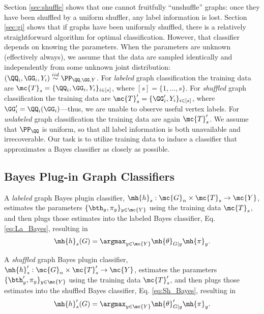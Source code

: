 \documentclass[10pt,journal,cspaper,compsoc]{IEEEtran}
\begin{document}
Section \ref{sec:shuffle} shows that one cannot fruitfully ``unshuffle'' graphs: once they have been shuffled by a uniform shuffler, any label information is lost.  Section \ref{sec:gi} shows that if graphs have been uniformly shuffled, there is a relatively straightforward algorithm for optimal classification. However, that classifier depends on knowing the parameters.
When the parameters are unknown (effectively always), we assume that the data are sampled identically and independently from some unknown joint distribution: $(\QQ_i,\GG_i,Y_i)\overset{iid}{\sim}\PP_{\QQ,\GG,Y}$.  
For \emph{labeled} graph classification the training data are $\mc{T}_s=\{\QQ_i,\GG_i,Y_i\}_{i \in [s]}$, where $[s]=\{1,\ldots,s\}$.  
For \emph{shuffled} graph classification the training data are $\mc{T}_s'=\{\GG_i',Y_i\}_{i \in [s]}$, where $\GG_i'=\QQ_i(\GG_i)$---thus, we are unable to observe useful vertex labels.  For \emph{unlabeled} graph classification the training data are again $\mc{T}_s'$. We assume that $\PP_{\QQ}$ is uniform, so that all label information is both unavailable and irrecoverable.  Our task is to utilize training data to induce a classifier
that approximates 
a Bayes classifier
as closely as possible.  



\subsection{Bayes Plug-in Graph Classifiers} %
\label{sec:bayes_optimal_graph_invariant_based_classifier}



A \emph{labeled} graph Bayes plugin classifier,
$\mh{h}_s: \mc{G}_n \times \mc{T}_s \to \mc{Y}$,
estimates the parameters $\{\bth_y,\pi_y\}_{y \in \mc{Y}}$ using the training data $\mc{T}_s$, and then plugs those estimates into the labeled Bayes classifier, Eq. \eqref{eq:La_Bayes}, resulting in
\begin{align} \label{eq:La_Plug}
	\mh{h}_s(G)=\argmax_{y\in\mc{Y}} \mh{\theta}_{G|y}\mh{\pi}_y.
\end{align}

A \emph{shuffled} graph Bayes plugin classifier,
$\mh{h}_s': \mc{G}_n \times \mc{T}_s' \to \mc{Y}$,
estimates the parameters $\{\bth_y',\pi_y\}_{y \in \mc{Y}}$ using the training data $\mc{T}_s'$, and then plugs those estimates into the shuffled Bayes classifier, Eq. \eqref{eq:Sh_Bayes}, resulting in
\begin{align} \label{eq:Sh_Plug}
	\mh{h}_s'(G)=\argmax_{y\in\mc{Y}} \mh{\theta}_{G|y}'\mh{\pi}_y.
\end{align}
\end{document}
